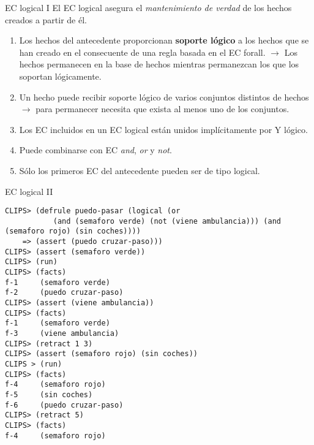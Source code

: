 \documentclass[usenames,dvipsnames,aspectratio=169]{beamer}
\begin{document}
\begin{frame}{EC logical I}
	El EC logical asegura el \textit{mantenimiento de verdad} de los hechos creados a partir de él.
	\begin{enumerate}
		\item Los hechos del antecedente proporcionan \textbf{soporte lógico} a los hechos que se han creado en el consecuente de una regla basada en el EC forall. $\rightarrow$ Los hechos permanecen en la base de hechos mientras permanezcan los que los soportan lógicamente.
		\item  Un hecho puede recibir soporte lógico de varios conjuntos distintos de hechos $\rightarrow$ para permanecer necesita que exista al menos uno de los conjuntos.
		\item Los EC incluidos en un EC logical están unidos implícitamente por Y lógico.
		\item Puede combinarse con EC \textit{and}, \textit{or} y \textit{not}.
		\item Sólo los primeros EC del antecedente pueden ser de tipo logical.
	\end{enumerate}
\end{frame}

\begin{frame}[fragile]{EC logical II}
	\scriptsize
	\begin{verbatim}
CLIPS> (defrule puedo-pasar (logical (or
           (and (semaforo verde) (not (viene ambulancia))) (and (semaforo rojo) (sin coches))))
    => (assert (puedo cruzar-paso)))
CLIPS> (assert (semaforo verde))
CLIPS> (run)
CLIPS> (facts)
f-1     (semaforo verde)
f-2     (puedo cruzar-paso)
CLIPS> (assert (viene ambulancia))
CLIPS> (facts)
f-1     (semaforo verde)
f-3     (viene ambulancia)
CLIPS> (retract 1 3)
CLIPS> (assert (semaforo rojo) (sin coches))
CLIPS > (run)
CLIPS> (facts)
f-4     (semaforo rojo)
f-5     (sin coches)
f-6     (puedo cruzar-paso)
CLIPS> (retract 5)
CLIPS> (facts)
f-4     (semaforo rojo)
	\end{verbatim}
\end{frame}
 
\begin{frame}
\titlepage
\end{frame}
\end{document}
